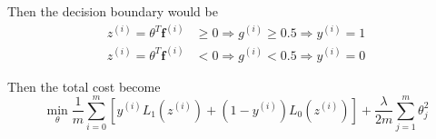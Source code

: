 \begin{itemize}
Then the decision boundary would be
\begin{equation}
    \begin{split}
        z^{(i)} = \theta^T \mathbf{f}^{(i)} & \geq 0 \Rightarrow g^{(i)} \geq 0.5 \Rightarrow y^{(i)} = 1\\
        z^{(i)} = \theta^T \mathbf{f}^{(i)} & <    0 \Rightarrow g^{(i)} <    0.5 \Rightarrow y^{(i)} = 0
    \end{split}
\end{equation}

Then the total cost become
\begin{equation}
    \min_\theta \frac{1}{m} \sum_{i=0}^{m} \left[{y^{(i)} L_1(z^{(i)}) + (1-y^{(i)}) L_0(z^{(i)}) }\right] + \frac{\lambda}{2m} \sum_{j=1}^{m} \theta_j^2
\end{equation}
\end{itemize}

